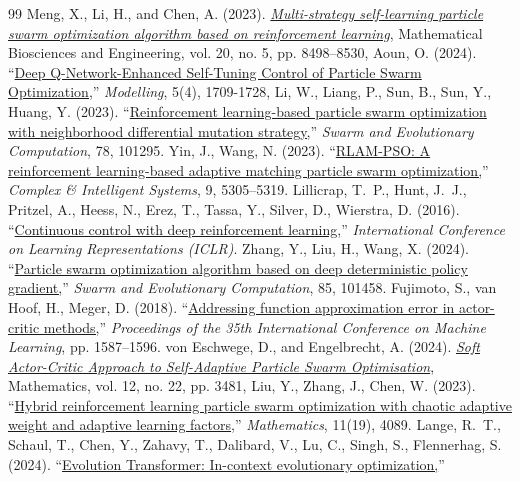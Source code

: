 \documentclass[final,5p,times]{elsarticle}
\begin{document}
\begin{table}[t]
{\begin{thebibliography}{99}
Meng, X., Li, H., and Chen, A.
(2023).
\href{https://doi.org/10.3934/mbe.2023373}{\emph{Multi-strategy self-learning particle swarm optimization algorithm based on reinforcement learning}},
Mathematical Biosciences and Engineering,
vol. 20, no. 5, pp. 8498--8530, 
Aoun, O.
(2024).
``\href{https://doi.org/10.3390/modelling5040089}{Deep Q-Network-Enhanced Self-Tuning Control of Particle Swarm Optimization,}''
\textit{Modelling}, 5(4), 1709-1728, 
Li, W., Liang, P., Sun, B., Sun, Y., Huang, Y.
(2023).
``\href{https://doi.org/10.1016/j.swevo.2023.101274}{Reinforcement learning-based particle swarm optimization with neighborhood differential mutation strategy,}''
\textit{Swarm and Evolutionary Computation}, 78, 101295. 
Yin, J., Wang, N.
(2023).
``\href{https://doi.org/10.1007/s40747-023-01012-8}{RLAM-PSO: A reinforcement learning-based adaptive matching particle swarm optimization,}''
\textit{Complex \& Intelligent Systems}, 9, 5305--5319. 
Lillicrap, T.~P., Hunt, J.~J., Pritzel, A., Heess, N., Erez, T., Tassa, Y., Silver, D., Wierstra, D.
(2016).
``\href{https://arxiv.org/abs/1509.02971}{Continuous control with deep reinforcement learning,}''
\textit{International Conference on Learning Representations (ICLR)}. 
Zhang, Y., Liu, H., Wang, X.
(2024).
``\href{https://doi.org/10.1016/j.swevo.2024.101458}{Particle swarm optimization algorithm based on deep deterministic policy gradient,}''
\textit{Swarm and Evolutionary Computation}, 85, 101458. 
Fujimoto, S., van Hoof, H., Meger, D.
(2018).
``\href{https://arxiv.org/abs/1802.09477}{Addressing function approximation error in actor-critic methods,}''
\textit{Proceedings of the 35th International Conference on Machine Learning}, pp. 1587--1596. 
von Eschwege, D., and Engelbrecht, A.
(2024).
\href{https://doi.org/10.3390/math12223481}{\emph{Soft Actor-Critic Approach to Self-Adaptive Particle Swarm Optimisation}},
Mathematics,
vol. 12, no. 22, pp. 3481, 
Liu, Y., Zhang, J., Chen, W.
(2023).
``\href{https://doi.org/10.3390/math11194089}{Hybrid reinforcement learning particle swarm optimization with chaotic adaptive weight and adaptive learning factors,}''
\textit{Mathematics}, 11(19), 4089. 
Lange, R.~T., Schaul, T., Chen, Y., Zahavy, T., Dalibard, V., Lu, C., Singh, S., Flennerhag, S.
(2024).
``\href{https://arxiv.org/abs/2403.02985}{Evolution Transformer: In-context evolutionary optimization,}''

\end{thebibliography}}
\end{table}
\end{document}
